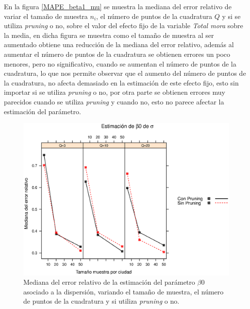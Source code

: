 En la figura \ref{MAPE_beta1_mu} se muestra la mediana del error relativo de variar el tama\~{n}o de muestra $n_i$, el n\'{u}mero de puntos de la cuadratura $Q$ y si se utiliza \textit{pruning} o no, sobre el valor del efecto fijo de la variable \textsl{Total mora} sobre la media, en dicha figura se muestra como el tama\~{n}o de muestra al ser aumentado obtiene una reducci\'{o}n de la mediana del error relativo, adem\'{a}s al aumentar el n\'{u}mero de puntos de la cuadratura se obtienen errores un poco menores, pero no significativo, cuando se aumentan el n\'{u}mero de puntos de la cuadratura, lo que nos permite observar que el aumento del n\'{u}mero de puntos de la cuadratura, no afecta demasiado en la estimaci\'{o}n de este efecto fijo, esto sin importar si se utiliza \textit{pruning} o no, por otra parte se obtienen errores muy parecidos cuando se utiliza \textit{pruning} y cuando no, esto no parece afectar la estimaci\'{o}n del par\'{a}metro.\\

\begin{figure}
	\begin{center}
		\includegraphics[scale=0.6]{MAPE_beta0_sigma.eps}	
		\caption{Mediana del error relativo de la estimaci\'{o}n del par\'{a}metro $\beta0$ asociado a la dispersi\'{o}n, variando el tama\~{n}o de muestra, el n\'{u}mero de puntos de la cuadratura y si utiliza \textit{pruning} o no.}
		\label{MAPE_beta0_sigma}
	\end{center}
\end{figure}

